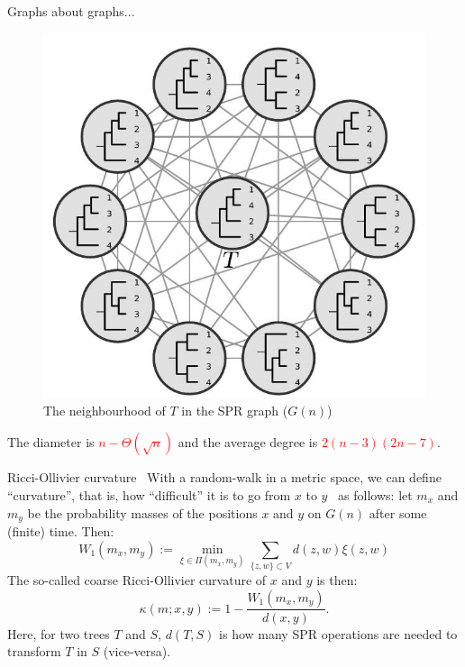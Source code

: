 \begin{frame}{Graphs about graphs...}
 \begin{center}
  \begin{figure}
   \includegraphics[scale=0.35]{FIGURES/spr_graph.jpg}
   \caption{The neighbourhood of $T$ in the SPR graph ($G(n)$)~\citep{whidden2015}}
  \end{figure}
   The diameter is \textcolor{red}{$n - \Theta(\sqrt{n})$} and the average degree is \textcolor{red}{$2(n-3)(2n-7)$}.
 \end{center}
\end{frame}
\begin{frame}{Ricci-Ollivier curvature~\citep{whidden2015}}
 With a random-walk in a metric space, we can define ``curvature'', that is, how ``difficult'' it is to go from $x$ to $y$~\citep{ollivier2009} as follows:
 let $m_x$ and $m_y$ be the probability masses of the positions $x$ and $y$ on $G(n)$ after some (finite) time. Then:
 \begin{equation}
 W_1(m_x, m_y) := \min_{\xi \in \Pi(m_x, m_y)} \sum_{\{z,w\} \subset V} d(z,w) \xi(z,w)
 \end{equation}
The so-called coarse Ricci-Ollivier curvature of $x$ and $y$ is then:
\begin{equation}
\kappa(m; x, y) := 1 - \frac{W_1(m_x, m_y)}{d(x, y)}.
\end{equation}
Here, for two trees $T$ and $S$, $d(T,S)$ is how many SPR operations are needed to transform $T$ in $S$ (vice-versa). 
\end{frame}
